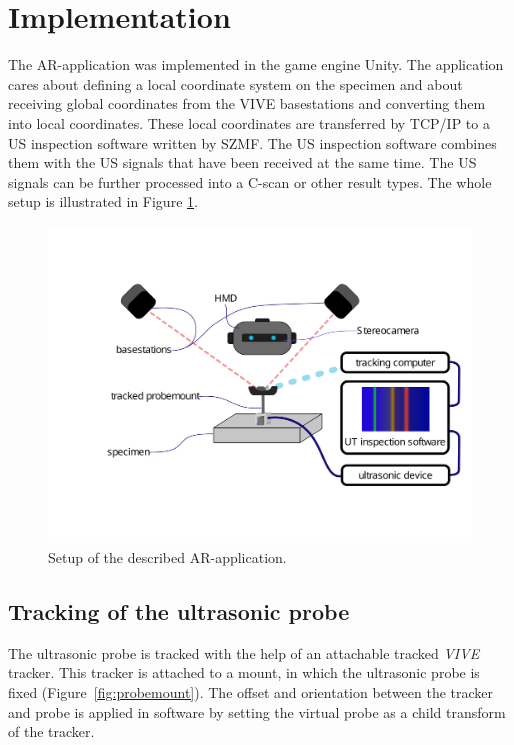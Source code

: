 \documentclass{VRARWorkshop}
\begin{document}
\section{Implementation}
The AR-application was implemented in the game engine Unity. The application cares about defining a local coordinate 
system on the specimen and about receiving 
global coordinates from the VIVE basestations 
and converting them into local coordinates.
These local coordinates are transferred by TCP/IP to a US inspection software written by SZMF.
The US inspection software combines them with the US signals that have been received
at the same time. The US signals can be further processed into a C-scan or other result types.
The whole setup is illustrated in Figure \ref{fig:Setup}. \\
\begin{figure}[h!]
    \begin{center}
        \includegraphics[width=158mm]{images/Setup-ARUS}
        \caption{\label{fig:Setup} Setup of the described AR-application.}
    \end{center}
\end{figure}

\subsection{Tracking of the ultrasonic probe}
The ultrasonic probe is tracked with the help of an attachable tracked \textit{VIVE} tracker.
This tracker is attached to a mount, in which the ultrasonic probe is fixed (Figure~\ref{fig:probemount}).
The offset and orientation between the tracker and probe is applied in software by setting the virtual probe as a child transform of the tracker.
\end{document}
